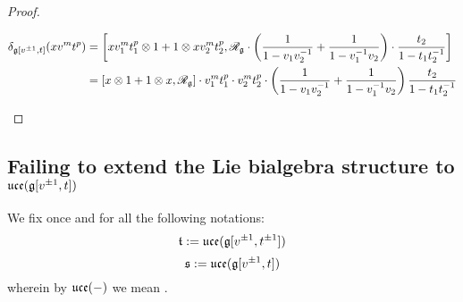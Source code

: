 \begin{proof}
\begin{enumerate}
$$\begin{aligned}
                                    \delta_{\g[v^{\pm 1}, t]}( x v^m t^p ) & = \left[x v_1^m t_1^p \tensor 1 + 1 \tensor x v_2^m t_2^p, \scrR_{\g} \cdot \left( \frac{1}{1 - v_1 v_2^{-1}} + \frac{1}{1 - v_1^{-1} v_2} \right) \cdot \frac{t_2}{1 - t_1 t_2^{-1}}\right]
                                    \\
                                    & = [x \tensor 1 + 1 \tensor x, \scrR_{\g}] \cdot v_1^m t_1^p \cdot v_2^m t_2^p \cdot \left( \frac{1}{1 - v_1 v_2^{-1}} + \frac{1}{1 - v_1^{-1} v_2} \right) \frac{t_2}{1 - t_1 t_2^{-1}}
                                \end{aligned}
                            $$
                    \end{enumerate}
                \end{proof}

        \subsection{Failing to extend the Lie bialgebra structure to \texorpdfstring{$\mathfrak{uce}( \mathfrak{g}[v^{\pm 1}, t] )$}{}}
            \begin{convention}
                We fix once and for all the following notations:
                    $$\mathfrak{t} := \mathfrak{uce}( \mathfrak{g}[v^{\pm 1}, t^{\pm 1}] )$$
                    $$\mathfrak{s} := \mathfrak{uce}( \mathfrak{g}[v^{\pm 1}, t] )$$
                wherein by $\mathfrak{uce}(-)$ we mean . 
            \end{convention}
        
